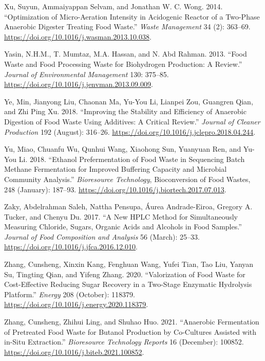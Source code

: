 \documentclass[11pt]{report}
\begin{document}
\begin{hangparas}{1.5em}{1}
\hypertarget{citeproc_bib_item_93}{Xu, Suyun, Ammaiyappan Selvam, and Jonathan W. C. Wong. 2014. “Optimization of Micro-Aeration Intensity in Acidogenic Reactor of a Two-Phase Anaerobic Digester Treating Food Waste.” \textit{Waste Management} 34 (2): 363–69. \url{https://doi.org/10.1016/j.wasman.2013.10.038}.}

\hypertarget{citeproc_bib_item_94}{Yasin, N.H.M., T. Mumtaz, M.A. Hassan, and N. Abd Rahman. 2013. “Food Waste and Food Processing Waste for Biohydrogen Production: A Review.” \textit{Journal of Environmental Management} 130: 375–85. \url{https://doi.org/10.1016/j.jenvman.2013.09.009}.}

\hypertarget{citeproc_bib_item_95}{Ye, Min, Jianyong Liu, Chaonan Ma, Yu-You Li, Lianpei Zou, Guangren Qian, and Zhi Ping Xu. 2018. “Improving the Stability and Efficiency of Anaerobic Digestion of Food Waste Using Additives: A Critical Review.” \textit{Journal of Cleaner Production} 192 (August): 316–26. \url{https://doi.org/10.1016/j.jclepro.2018.04.244}.}

\hypertarget{citeproc_bib_item_96}{Yu, Miao, Chuanfu Wu, Qunhui Wang, Xiaohong Sun, Yuanyuan Ren, and Yu-You Li. 2018. “Ethanol Prefermentation of Food Waste in Sequencing Batch Methane Fermentation for Improved Buffering Capacity and Microbial Community Analysis.” \textit{Bioresource Technology}, Bioconversion of Food Wastes, 248 (January): 187–93. \url{https://doi.org/10.1016/j.biortech.2017.07.013}.}

\hypertarget{citeproc_bib_item_97}{Zaky, Abdelrahman Saleh, Nattha Pensupa, Áurea Andrade-Eiroa, Gregory A. Tucker, and Chenyu Du. 2017. “A New HPLC Method for Simultaneously Measuring Chloride, Sugars, Organic Acids and Alcohols in Food Samples.” \textit{Journal of Food Composition and Analysis} 56 (March): 25–33. \url{https://doi.org/10.1016/j.jfca.2016.12.010}.}

\hypertarget{citeproc_bib_item_98}{Zhang, Cunsheng, Xinxin Kang, Fenghuan Wang, Yufei Tian, Tao Liu, Yanyan Su, Tingting Qian, and Yifeng Zhang. 2020. “Valorization of Food Waste for Cost-Effective Reducing Sugar Recovery in a Two-Stage Enzymatic Hydrolysis Platform.” \textit{Energy} 208 (October): 118379. \url{https://doi.org/10.1016/j.energy.2020.118379}.}

\hypertarget{citeproc_bib_item_99}{Zhang, Cunsheng, Zhihui Ling, and Shuhao Huo. 2021. “Anaerobic Fermentation of Pretreated Food Waste for Butanol Production by Co-Cultures Assisted with in-Situ Extraction.” \textit{Bioresource Technology Reports} 16 (December): 100852. \url{https://doi.org/10.1016/j.biteb.2021.100852}.}


\end{hangparas}
\end{document}
